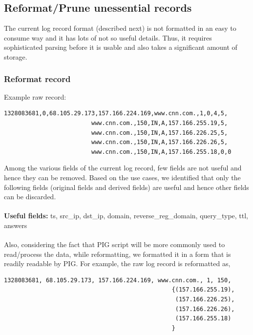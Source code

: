 \documentclass[11pt,a4paper]{article}
\begin{document}
\subsection {Reformat/Prune unessential records}
The current log record format (described next) is not formatted in an easy to consume way and it has lots of not so useful details. Thus, it requires sophisticated parsing before it is usable and also takes a significant amount of storage.

\subsubsection{Reformat record}
Example raw record:
\begin{verbatim}
1328083681,0,68.105.29.173,157.166.224.169,www.cnn.com.,1,0,4,5,
                         www.cnn.com.,150,IN,A,157.166.255.19,5,
                         www.cnn.com.,150,IN,A,157.166.226.25,5,
                         www.cnn.com.,150,IN,A,157.166.226.26,5,
                         www.cnn.com.,150,IN,A,157.166.255.18,0,0
\end{verbatim}
Among the various fields of the current log record, few fields are not useful and hence they can be removed. Based on the use cases, we identified that only the following fields (original fields and derived fields) are useful and hence other fields can be discarded.
\\\\
\textbf{Useful fields:} ts, src\_ip, dst\_ip, domain, reverse\_reg\_domain, query\_type, ttl, answers
\\\\
Also, considering the fact that PIG script will be more commonly used to read/process the data, while reformatting, we formatted it in a form that is readily readable by PIG.
\newpage
\noindent
For example, the raw log record is reformatted as,
\begin{verbatim}
1328083681, 68.105.29.173, 157.166.224.169, www.cnn.com., 1, 150, 
                                                {(157.166.255.19),
                                                 (157.166.226.25),
                                                 (157.166.226.26),
                                                 (157.166.255.18)
                                                }
\end{verbatim}
\end{document}
